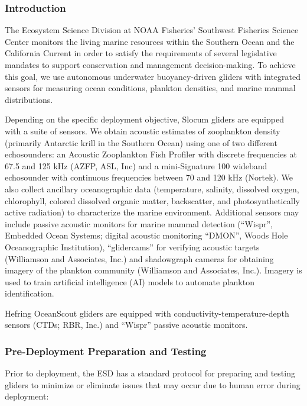 \documentclass[
  letterpaper,
  DIV=11,
  numbers=noendperiod]{scrartcl}
\begin{document}
\subsubsection{Introduction}\label{introduction}

The Ecosystem Science Division at NOAA Fisheries' Southwest Fisheries
Science Center monitors the living marine resources within the Southern
Ocean and the California Current in order to satisfy the requirements of
several legislative mandates to support conservation and management
decision-making. To achieve this goal, we use autonomous underwater
buoyancy-driven gliders with integrated sensors for measuring ocean
conditions, plankton densities, and marine mammal distributions.

Depending on the specific deployment objective, Slocum gliders are
equipped with a suite of sensors. We obtain acoustic estimates of
zooplankton density (primarily Antarctic krill in the Southern Ocean)
using one of two different echosounders: an Acoustic Zooplankton Fish
Profiler with discrete frequencies at 67.5 and 125 kHz (AZFP, ASL, Inc)
and a mini-Signature 100 wideband echosounder with continuous
frequencies between 70 and 120 kHz (Nortek). We also collect ancillary
oceanographic data (temperature, salinity, dissolved oxygen,
chlorophyll, colored dissolved organic matter, backscatter, and
photosynthetically active radiation) to characterize the marine
environment. Additional sensors may include passive acoustic monitors
for marine mammal detection (``Wispr'', Embedded Ocean Systems; digital
acoustic monitoring ``DMON'', Woods Hole Oceanographic Institution),
``glidercams'' for verifying acoustic targets (Williamson and
Associates, Inc.) and shadowgraph cameras for obtaining imagery of the
plankton community (Williamson and Associates, Inc.). Imagery is used to
train artificial intelligence (AI) models to automate plankton
identification.

Hefring OceanScout gliders are equipped with
conductivity-temperature-depth sensors (CTDs; RBR, Inc.) and ``Wispr''
passive acoustic monitors.

\subsubsection{Pre-Deployment Preparation and
Testing}\label{pre-deployment-preparation-and-testing}

Prior to deployment, the ESD has a standard protocol for preparing and
testing gliders to minimize or eliminate issues that may occur due to
human error during deployment:
\end{document}
